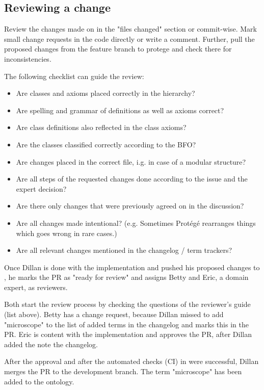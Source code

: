 \subsection{Reviewing a change}
Review the changes made on {\github} in the "files changed" section or commit-wise. Mark small change requests in the code directly or write a comment. Further, pull the proposed changes from the feature branch to protege and check there for inconsistencies. 

The following checklist can guide the review:
\begin{itemize}
    \item[$\Box$] Are classes and axioms placed correctly in the hierarchy?
    \item[$\Box$] Are spelling and grammar of definitions as well as axioms correct?
    \item[$\Box$] Are class definitions also reflected in the class axioms?
    \item[$\Box$] Are the classes classified correctly according to the BFO?
    \item[$\Box$] Are changes placed in the correct file, i.g. in case of a modular structure?
    \item[$\Box$] Are all steps of the requested changes done according to the issue and the expert decision?
    \item[$\Box$] Are there only changes that were previously agreed on in the discussion?
    \item[$\Box$] Are all changes made intentional? (e.g. Sometimes Protégé rearranges things which goes wrong in rare cases.)
    \item[$\Box$] Are all relevant changes mentioned in the changelog / term trackers?
\end{itemize}
    
\begin{example}
Once Dillan is done with the implementation and pushed his proposed changes to {\github}, he marks the PR as "ready for review" and assigns Betty and Eric, a domain expert, as reviewers. 

Both start the review process by checking the questions of the reviewer's guide (list above). 
Betty has a change request, because Dillan missed to add "microscope" to the list of added terms in the changelog and marks this in the PR. Eric is content with the implementation and approves the PR, after Dillan added the note the changelog.

After the approval and after the automated checks (CI) in {\github} were successful, Dillan merges the PR to the development branch. The term "microscope" has been added to the ontology.
\end{example}

